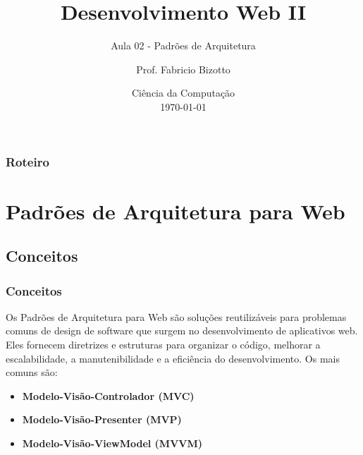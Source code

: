 \documentclass[
	9pt, %
	t, %
]{beamer}
\title[DesWebII]{Desenvolvimento Web II} %
\subtitle{Aula 02 - Padrões de Arquitetura} %
\author[Fabricio Bizotto]{Prof. Fabricio Bizotto} %
\institute[IFC]{Instituto Federal Catarinense \\ \smallskip \textit{fabricio.bizotto@ifc.edu.br}} %
\date[\today]{Ciência da Computação \\ \today} %
\begin{document}

\begin{frame}
	\titlepage %
\end{frame}


\begin{frame}
	\frametitle{Roteiro} %
	
	\tableofcontents %
\end{frame}


\section{Padrões de Arquitetura para Web} %


\subsection{Conceitos}

\begin{frame}
	\frametitle{Conceitos}
	
	Os \alert{Padrões de Arquitetura para Web} são soluções reutilizáveis para problemas comuns de design de software que surgem no desenvolvimento de aplicativos web. Eles fornecem \alert{diretrizes e estruturas} para organizar o código, melhorar a escalabilidade, a manutenibilidade e a eficiência do desenvolvimento. Os mais comuns são:

	\begin{itemize}
		\item \textbf{Modelo-Visão-Controlador (MVC)}
		\item \textbf{Modelo-Visão-Presenter (MVP)}
		\item \textbf{Modelo-Visão-ViewModel (MVVM)}
	\end{itemize}
\end{frame}
\end{document}
